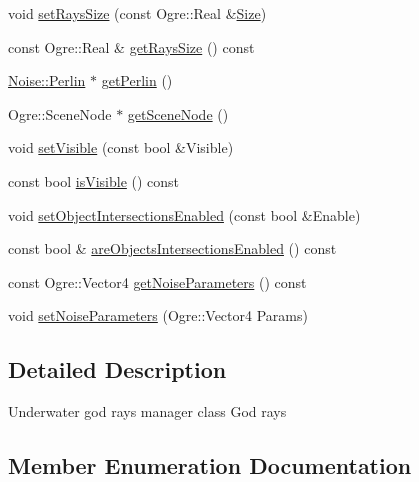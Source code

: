 \begin{CompactItemize}
\begin{CompactItemize}
\item 
void \hyperlink{class_hydrax_1_1_god_rays_manager_92f0cf78d74335694d7e81b23e654ee7}{setRaysSize} (const Ogre::Real \&\hyperlink{struct_hydrax_1_1_size}{Size})
\item 
const Ogre::Real \& \hyperlink{class_hydrax_1_1_god_rays_manager_80a4d001a4fd540a73cdbded89660c8d}{getRaysSize} () const 
\item 
\hyperlink{class_hydrax_1_1_noise_1_1_perlin}{Noise::Perlin} $\ast$ \hyperlink{class_hydrax_1_1_god_rays_manager_90d9d1c53fc66eae89e4334580cd73bb}{getPerlin} ()
\item 
Ogre::SceneNode $\ast$ \hyperlink{class_hydrax_1_1_god_rays_manager_9b94205d807dc98568fe5161a0bbc6d7}{getSceneNode} ()
\item 
void \hyperlink{class_hydrax_1_1_god_rays_manager_1cf1f1ec683484ee6949a32bb4fe0e62}{setVisible} (const bool \&Visible)
\item 
const bool \hyperlink{class_hydrax_1_1_god_rays_manager_b58ff59d51808f29ad9108870200d264}{isVisible} () const 
\item 
void \hyperlink{class_hydrax_1_1_god_rays_manager_4a85152f7e71a50c473ae65b299f3465}{setObjectIntersectionsEnabled} (const bool \&Enable)
\item 
const bool \& \hyperlink{class_hydrax_1_1_god_rays_manager_e150748f9126fee118cf9262b76db170}{areObjectsIntersectionsEnabled} () const 
\item 
const Ogre::Vector4 \hyperlink{class_hydrax_1_1_god_rays_manager_cbbe97591ed2ce41ff2791c00588823d}{getNoiseParameters} () const 
\item 
void \hyperlink{class_hydrax_1_1_god_rays_manager_7ca2848326fa661d5a62a830b108be38}{setNoiseParameters} (Ogre::Vector4 Params)
\end{CompactItemize}


\subsection{Detailed Description}
Underwater god rays manager class God rays 

\subsection{Member Enumeration Documentation}
\hypertarget{class_hydrax_1_1_god_rays_manager_88654235c3d8c74a152a8b81b9a419cb}{
}
\end{CompactItemize}
